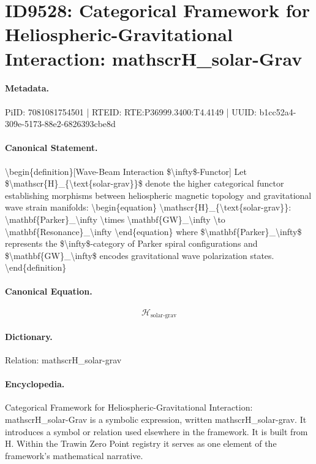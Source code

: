 \section*{ID9528: Categorical Framework for Heliospheric-Gravitational Interaction: mathscrH\_solar-Grav}
\paragraph{Metadata.}
PiID: 7081081754501 | RTEID: RTE:P36999.3400:T4.4149 | UUID: b1cc52a4-309e-5173-88e2-6826393cbe8d

\paragraph{Canonical Statement.}
\textbackslash{}begin\{definition\}[Wave-Beam Interaction \$\textbackslash{}infty\$-Functor] Let \$\textbackslash{}mathscr\{H\}\_\{\textbackslash{}text\{solar-grav\}\}\$ denote the higher categorical functor establishing morphisms between heliospheric magnetic topology and gravitational wave strain manifolds: \textbackslash{}begin\{equation\} \textbackslash{}mathscr\{H\}\_\{\textbackslash{}text\{solar-grav\}\}: \textbackslash{}mathbf\{Parker\}\_\textbackslash{}infty \textbackslash{}times \textbackslash{}mathbf\{GW\}\_\textbackslash{}infty \textbackslash{}to \textbackslash{}mathbf\{Resonance\}\_\textbackslash{}infty \textbackslash{}end\{equation\} where \$\textbackslash{}mathbf\{Parker\}\_\textbackslash{}infty\$ represents the \$\textbackslash{}infty\$-category of Parker spiral configurations and \$\textbackslash{}mathbf\{GW\}\_\textbackslash{}infty\$ encodes gravitational wave polarization states. \textbackslash{}end\{definition\}

\paragraph{Canonical Equation.}
\[
\mathscr{H}_{\text{solar-grav}}
\]

\paragraph{Dictionary.}
Relation: mathscrH\_solar-grav

\paragraph{Encyclopedia.}
Categorical Framework for Heliospheric-Gravitational Interaction: mathscrH\_solar-Grav is a symbolic expression, written mathscrH\_solar-grav. It introduces a symbol or relation used elsewhere in the framework. It is built from H. Within the Trawin Zero Point registry it serves as one element of the framework's mathematical narrative.
